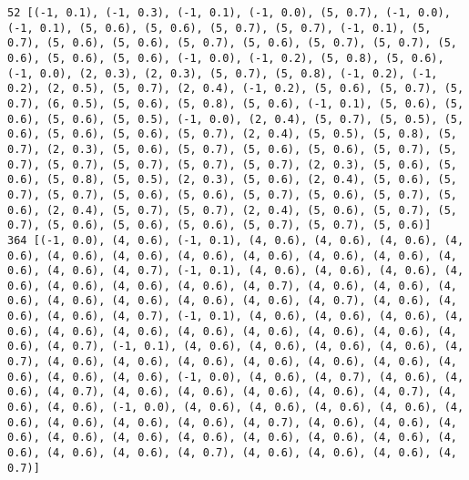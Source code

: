 \documentclass[11pt]{article}
\begin{document}
\begin{Verbatim}[commandchars=\\\{\}]
52 [(-1, 0.1), (-1, 0.3), (-1, 0.1), (-1, 0.0), (5, 0.7), (-1, 0.0), (-1, 0.1), (5, 0.6), (5, 0.6), (5, 0.7), (5, 0.7), (-1, 0.1), (5, 0.7), (5, 0.6), (5, 0.6), (5, 0.7), (5, 0.6), (5, 0.7), (5, 0.7), (5, 0.6), (5, 0.6), (5, 0.6), (-1, 0.0), (-1, 0.2), (5, 0.8), (5, 0.6), (-1, 0.0), (2, 0.3), (2, 0.3), (5, 0.7), (5, 0.8), (-1, 0.2), (-1, 0.2), (2, 0.5), (5, 0.7), (2, 0.4), (-1, 0.2), (5, 0.6), (5, 0.7), (5, 0.7), (6, 0.5), (5, 0.6), (5, 0.8), (5, 0.6), (-1, 0.1), (5, 0.6), (5, 0.6), (5, 0.6), (5, 0.5), (-1, 0.0), (2, 0.4), (5, 0.7), (5, 0.5), (5, 0.6), (5, 0.6), (5, 0.6), (5, 0.7), (2, 0.4), (5, 0.5), (5, 0.8), (5, 0.7), (2, 0.3), (5, 0.6), (5, 0.7), (5, 0.6), (5, 0.6), (5, 0.7), (5, 0.7), (5, 0.7), (5, 0.7), (5, 0.7), (5, 0.7), (2, 0.3), (5, 0.6), (5, 0.6), (5, 0.8), (5, 0.5), (2, 0.3), (5, 0.6), (2, 0.4), (5, 0.6), (5, 0.7), (5, 0.7), (5, 0.6), (5, 0.6), (5, 0.7), (5, 0.6), (5, 0.7), (5, 0.6), (2, 0.4), (5, 0.7), (5, 0.7), (2, 0.4), (5, 0.6), (5, 0.7), (5, 0.7), (5, 0.6), (5, 0.6), (5, 0.6), (5, 0.7), (5, 0.7), (5, 0.6)]
364 [(-1, 0.0), (4, 0.6), (-1, 0.1), (4, 0.6), (4, 0.6), (4, 0.6), (4, 0.6), (4, 0.6), (4, 0.6), (4, 0.6), (4, 0.6), (4, 0.6), (4, 0.6), (4, 0.6), (4, 0.6), (4, 0.7), (-1, 0.1), (4, 0.6), (4, 0.6), (4, 0.6), (4, 0.6), (4, 0.6), (4, 0.6), (4, 0.6), (4, 0.7), (4, 0.6), (4, 0.6), (4, 0.6), (4, 0.6), (4, 0.6), (4, 0.6), (4, 0.6), (4, 0.7), (4, 0.6), (4, 0.6), (4, 0.6), (4, 0.7), (-1, 0.1), (4, 0.6), (4, 0.6), (4, 0.6), (4, 0.6), (4, 0.6), (4, 0.6), (4, 0.6), (4, 0.6), (4, 0.6), (4, 0.6), (4, 0.6), (4, 0.7), (-1, 0.1), (4, 0.6), (4, 0.6), (4, 0.6), (4, 0.6), (4, 0.7), (4, 0.6), (4, 0.6), (4, 0.6), (4, 0.6), (4, 0.6), (4, 0.6), (4, 0.6), (4, 0.6), (4, 0.6), (-1, 0.0), (4, 0.6), (4, 0.7), (4, 0.6), (4, 0.6), (4, 0.7), (4, 0.6), (4, 0.6), (4, 0.6), (4, 0.6), (4, 0.7), (4, 0.6), (4, 0.6), (-1, 0.0), (4, 0.6), (4, 0.6), (4, 0.6), (4, 0.6), (4, 0.6), (4, 0.6), (4, 0.6), (4, 0.6), (4, 0.7), (4, 0.6), (4, 0.6), (4, 0.6), (4, 0.6), (4, 0.6), (4, 0.6), (4, 0.6), (4, 0.6), (4, 0.6), (4, 0.6), (4, 0.6), (4, 0.6), (4, 0.7), (4, 0.6), (4, 0.6), (4, 0.6), (4, 0.7)]

\end{Verbatim}
\end{document}
